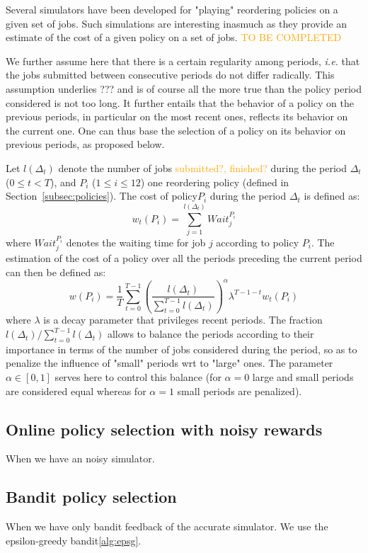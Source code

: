 \documentclass[sigconf]{acmart}
\begin{document}
Several simulators have been developed for "playing" reordering policies on a given set of jobs. Such simulations are interesting inasmuch as they provide an estimate of the cost of a given policy on a set of jobs. \textcolor{orange}{TO BE COMPLETED}

We further assume here that there is a certain regularity among periods, \textit{i.e.} that the jobs submitted between consecutive periods do not differ radically. This assumption underlies ??? and is of course all the more true than the policy period considered is not too long. It further entails that the behavior of a policy on the previous periods, in particular on the most recent ones, reflects its behavior on the current one. One can thus base the selection of a policy on its behavior on previous periods, as proposed below.

Let $l(\Delta_t)$ denote the number of jobs \textcolor{orange}{submitted?, finished?} during the period $\Delta_t$ ($0 \le t < T$), and $P_i$ ($1 \le i \le 12$) one reordering policy (defined in Section~\ref{subsec:policies}). The cost of policy$P_i$ during the period $\Delta_t$ is defined as:
%
\[
w_t(P_i) = \sum_{j=1}^{l(\Delta_t)} Wait_j^{P_i}
\]
%
where $Wait_j^{P_i}$ denotes the waiting time for job $j$ according to policy $P_i$. The estimation of the cost of a policy over all the periods preceding the current period can then be defined as:
%
\begin{equation}
w(P_i) = \frac{1}{T} \sum_{t=0}^{T-1} (\frac{l(\Delta_t)}{\sum_{t=0}^{T-1}l(\Delta_t)})^{\alpha}  \lambda^{T-1-t} w_t(P_i)
\end{equation}
%
where $\lambda$ is a decay parameter that privileges recent periods. The fraction $l(\Delta_t)/\sum_{t=0}^{T-1}l(\Delta_t)$ allows to balance the periods according to their importance in terms of the number of jobs considered during the period, so as to penalize the influence of "small" periods wrt to "large" ones. The parameter $\alpha \in [0,1]$ serves here to control this balance (for $\alpha=0$ large and small periods are considered equal whereas for $\alpha=1$ small periods are penalized).

\subsection{Online policy selection with noisy rewards}
\label{sub:noisy}
When we have an noisy simulator.

\subsection{Bandit policy selection}
\label{sub:bandit}
When we have only bandit feedback of the accurate simulator.
We use the epsilon-greedy bandit\ref{alg:epsg}.
\end{document}
